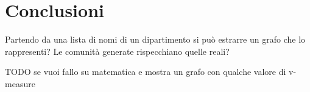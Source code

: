 \documentclass[12pt,a4paper,twoside]{report}
\begin{document}

\whitePage
\chapter{Conclusioni} \label{cap:conclusioni}

Partendo da una lista di nomi di un dipartimento si può estrarre un grafo che lo rappresenti? Le
comunità generate rispecchiano quelle reali?

TODO se vuoi fallo su matematica e mostra un grafo con qualche valore di v-measure






\end{document}
